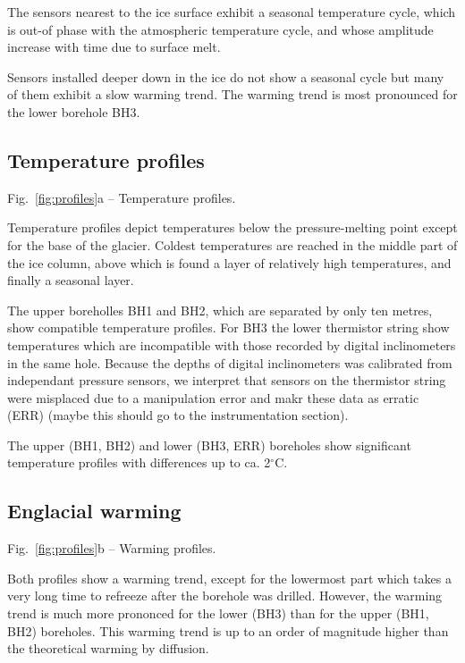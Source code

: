 \documentclass[utf8]{article}
\begin{document}
    The sensors nearest to the ice surface exhibit a seasonal temperature
    cycle, which is out-of phase with the atmospheric temperature cycle, and
    whose amplitude increase with time due to surface melt.

    Sensors installed deeper down in the ice do not show a seasonal cycle but
    many of them exhibit a slow warming trend. The warming trend is most
    pronounced for the lower borehole BH3.


\subsection{Temperature profiles}

    Fig.~\ref{fig:profiles}a -- Temperature profiles.

    Temperature profiles depict temperatures below the pressure-melting point
    except for the base of the glacier. Coldest temperatures are reached in the
    middle part of the ice column, above which is found a layer of relatively
    high temperatures, and finally a seasonal layer.

    The upper boreholles BH1 and BH2, which are separated by only ten metres,
    show compatible temperature profiles. For BH3 the lower thermistor string
    show temperatures which are incompatible with those recorded by digital
    inclinometers in the same hole. Because the depths of digital inclinometers
    was calibrated from independant pressure sensors, we interpret that sensors
    on the thermistor string were misplaced due to a manipulation error and
    makr these data as erratic (ERR) (maybe this should go to the
    instrumentation section).

    The upper (BH1, BH2) and lower (BH3, ERR) boreholes show significant
    temperature profiles with differences up to ca. 2$^\circ$C.

\subsection{Englacial warming}

    Fig.~\ref{fig:profiles}b -- Warming profiles.

    Both profiles show a warming trend, except for the lowermost part which
    takes a very long time to refreeze after the borehole was drilled.
    However, the warming trend is much more prononced for the lower (BH3) than
    for the upper (BH1, BH2) boreholes. This warming trend is up to an order of
    magnitude higher than the theoretical warming by diffusion.
\end{document}
